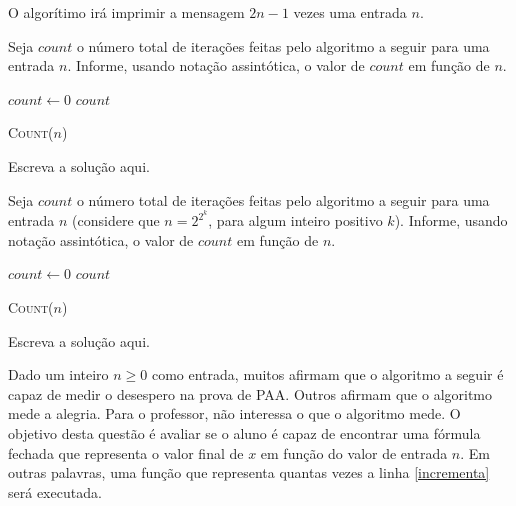 \documentclass[a4paper]{exam}
\DeclarePairedDelimiter{\floor}{\lfloor}{\rfloor}
\begin{document}
\begin{questions}
\begin{solution}
    \therefore O algorítimo irá imprimir a mensagem $2n-1$ vezes uma entrada $n$.
  \end{solution}
  \question Seja $count$ o número total de iterações feitas pelo
  algoritmo a seguir para uma entrada $n$. Informe, usando
  notação assintótica, o valor de $count$ em função de $n$.

  \begin{algorithm}[H]
    \NoCaptionOfAlgo
    \DontPrintSemicolon

    $count \gets 0$\;
    \Return $count$\;
    \caption{\textsc{Count}($n$)}
  \end{algorithm}
  \begin{solution}
    Escreva a solução aqui.
  \end{solution}
  \question Seja $count$ o número total de iterações feitas pelo
  algoritmo a seguir para uma entrada $n$ (considere que $n = 2^{2^{k}}$,
  para algum inteiro positivo $k$). Informe, usando
  notação assintótica, o valor de $count$ em função de $n$.
  
  \begin{algorithm}[H]
    \NoCaptionOfAlgo
    \DontPrintSemicolon

    $count \gets 0$\;
    \Return $count$\;
    \caption{\textsc{Count}($n$)}
  \end{algorithm}
  \begin{solution}
    Escreva a solução aqui.
  \end{solution}
  \question Dado um inteiro $n \geq 0$ como entrada, muitos
  afirmam que o algoritmo a seguir é capaz de medir o desespero na
  prova de PAA. Outros afirmam que o algoritmo mede a alegria. Para
  o professor, não interessa o que o algoritmo mede. O objetivo
  desta questão é avaliar se o aluno é capaz de encontrar uma
  fórmula fechada que representa o valor final de $x$ em função do
  valor de entrada $n$. Em outras palavras, uma função que
  representa quantas vezes a linha \ref{incrementa} será executada.

  \begin{algorithm}[H]
    \NoCaptionOfAlgo
    \DontPrintSemicolon


\end{algorithm}
\end{questions}
\end{document}
